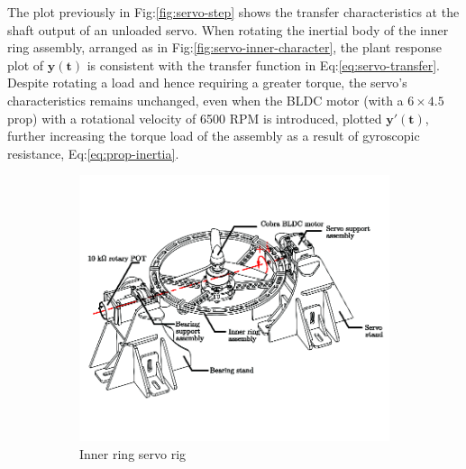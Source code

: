 \par
The plot previously in Fig:\ref{fig:servo-step} shows the transfer characteristics at the shaft output of an unloaded servo. When rotating the inertial body of the inner ring assembly, arranged as in Fig:\ref{fig:servo-inner-character}, the plant response plot of {\color{Blue}$\mathbf{y(t)}$} is consistent with the transfer function in Eq:\ref{eq:servo-transfer}. Despite rotating a load and hence requiring a greater torque, the servo's characteristics remains unchanged, even when the BLDC motor (with a $6\times4.5$ prop) with a rotational velocity of 6500 RPM is introduced, plotted {\color{Red}$\mathbf{y'(t)}$}, further increasing the torque load of the assembly as a result of gyroscopic resistance, Eq:\ref{eq:prop-inertia}.
\begin{figure}[htbp]
\vspace{-10pt}
\centering
\begin{subfigure}{0.46\textwidth}
\centering
\includegraphics[width=\textwidth]{figs/servo-inner}
\caption{Inner ring servo rig}
\label{fig:servo-inner}
\end{subfigure}
\begin{subfigure}{0.46\textwidth}
\centering

\end{subfigure}
\end{figure}
